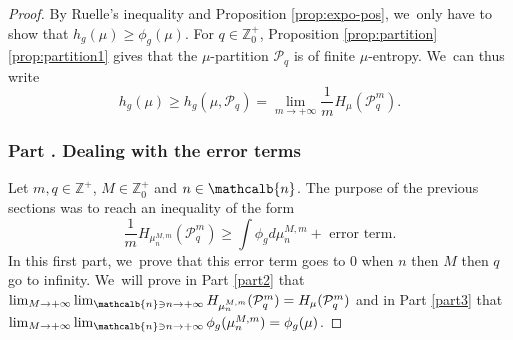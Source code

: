 \documentclass[JEP,XML,SOM,Unicode,NoFloatCountersInSection,published]{cedram}
\renewcommand{\thesubsubsection}{\arabic{subsubsection}}
\newcommand{\mcbn}{{\mathcalb{n}}}
\theoremstyle{definition}
\newcommand{\bbZ}{{\mathbb{Z}}}
\begin{document}
\begin{proof}
By Ruelle's inequality \cite{Ruelle1978} and Proposition \ref{prop:expo-pos}, we~only have to show that $h_g(\mu) \geq \phi_g(\mu)$.
For $q \in \bbZ_0^+$, Proposition \ref{prop:partition}\eqref{prop:partition1} gives that the $\mu$-partition $\mathcal{P}_q$ is of finite $\mu$-entropy. We~can thus write
\[
h_g(\mu) \geq h_g(\mu,\mathcal{P}_q) = \lim_{m \to +\infty} \frac{1}{m} H_{\mu}(\mathcal{P}_q^m).
\]

\label{part1}%
\subsubsection*{Part \thesubsubsection. Dealing with the error terms}

Let $m,q \in \bbZ^+$, $M \in \bbZ_0^+$ and $n \in \mcbn$.
The purpose of the previous sections was to reach an inequality of the form
\[
\frac{1}{m} H_{\mu_n^{M,m}}(\mathcal{P}_q^m) \geq \int \phi_g d \mu_n^{M,m} + \text{ error term.}
\]
In this first part, we~prove that this error term goes to 0 when $n$ then $M$ then $q$ go to infinity. We~will prove in Part \ref{part2} that
$\lim_{M \to +\infty} \lim_{\mcbn \ni n \to +\infty} H_{\mu_n^{M,m}}(\mathcal{P}_q^m) = H_{\mu}(\mathcal{P}_q^m)$ and in Part \ref{part3} that $\lim_{M \to +\infty} \lim_{\mcbn \ni n \to +\infty} \phi_g(\mu_n^{M,m}) = \phi_g(\mu)$.


\end{proof}
\end{document}
